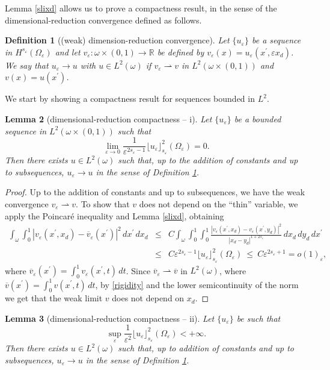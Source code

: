 \documentclass[11pt]{article}
\newtheorem{definition}{Definition}[section]
\newtheorem{lemma}[definition]{Lemma}
\def\e{\varepsilon}
\newcommand{\weak}{\rightharpoonup}
\begin{document}
Lemma \ref{slixd} allows us to prove a compactness result, in the sense of the dimensional-reduction convergence defined as follows. 
\begin{definition}[(weak) dimension-reduction convergence]\label{def-conv}
Let $\{u_\e\}$ be a sequence in $H^{s_\e}(\Omega_\e)$ and let $v_\e\colon\omega\times(0,1)\to\mathbb R$ be defined by $v_\e(x)=u_\e(x^\prime,\e x_d)$. We say 
that $u_\e\to u$ with $u\in L^2(\omega)$ if 
$v_\e\weak v$ in $L^2(\omega\times(0,1))$ and $v(x)=u(x^\prime)$.  
\end{definition}

We start by showing a compactness result for sequences bounded in $L^2$. 

\begin{lemma}[dimensional-reduction compactness -- i]\label{compactness1}  
Let $\{u_\e\}$ be a bounded sequence in $L^2(\omega\times(0,1))$ such that 
$$\lim_{\e\to 0}\frac{1}{\e^{2s_\e-1}} \lfloor u_\e\rfloor_{s_\e}^2(\Omega_\e)=0.$$ 
Then
there exists $u\in L^2(\omega)$ such that, up to the addition of constants and up to subsequences, 
$u_\e\to u$ in the sense of Definition {\rm \ref{def-conv}.} 
\end{lemma}

\begin{proof}
Up to the addition of constants and up to subsequences, we have the weak convergence $v_\e\weak v$. 
To show that $v$ does not depend on the ``thin'' variable, we apply the Poincar\'e inequality and Lemma \ref{slixd}, obtaining 
\begin{eqnarray}\label{rigidity}
\int_\omega\int_0^1 |v_\e(x^\prime, x_d)- \overline v_\e(x^\prime)|^2\, dx^\prime\, dx_d&\leq&C \int_\omega \int_0^1\int_0^1 
\frac{|v_\e(x^\prime, x_d)-v_\e(x^\prime, y_d)|^2}{|x_d-y_d|^{1+2s_\e}}\, dx_d\, dy_d\, dx^\prime\nonumber \\
&\leq&C \e^{2s_\e-1} \lfloor u_\e\rfloor_{s_\e}^2(\Omega_\e)\ \leq \ C \e^{2s_\e+1}=o(1)_\e,
\end{eqnarray}
where $\overline v_\e(x^\prime)=\int_0^1v_\e(x^\prime,t)\, dt$. Since $\overline v_\e\weak \overline v$ in $L^2(\omega)$, 
where $\overline v(x^\prime)=\int_{0}^1v(x^\prime, t)\, dt$, by \eqref{rigidity} and the lower semicontinuity of the norm we get that the weak limit $v$ does not depend on $x_d$. 
\end{proof}




\begin{lemma}[dimensional-reduction compactness -- ii]\label{compactness2} Let $\{u_\e\}$ be such that 
$$\sup_\e \frac{1}{\e^2} \lfloor u_\e\rfloor_{s_\e}^2(\Omega_\e)<+\infty.$$ 
Then
there exists $u\in L^2(\omega)$ such that, up to addition of constants and up to subsequences, 
$u_\e\to u$ in the sense of Definition \rm \ref{def-conv}.  
\end{lemma}
\end{document}
